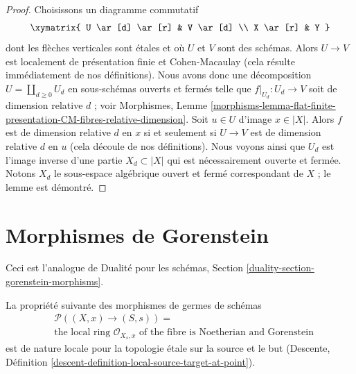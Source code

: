 \begin{proof}
Choisissons un diagramme commutatif
$$
\xymatrix{
U \ar[d] \ar[r] & V \ar[d] \\
X \ar[r] & Y
}
$$
dont les flèches verticales sont étales et où $U$ et $V$ sont des schémas.
Alors $U \to V$ est localement de présentation finie et Cohen-Macaulay
(cela résulte immédiatement de nos définitions).
Nous avons donc une décomposition $U = \coprod_{d \geq 0} U_d$
en sous-schémas ouverts et fermés telle que $f|_{U_d} : U_d \to V$
soit de dimension relative $d$ ; voir Morphismes, Lemme
\ref{morphisms-lemma-flat-finite-presentation-CM-fibres-relative-dimension}.
Soit $u \in U$ d'image $x \in |X|$. Alors
$f$ est de dimension relative $d$ en $x$ si et seulement si
$U \to V$ est de dimension relative $d$ en $u$
(cela découle de nos définitions).
Nous voyons ainsi que $U_d$ est l'image inverse
d'une partie $X_d \subset |X|$ qui est nécessairement
ouverte et fermée. Notons $X_d$ le sous-espace algébrique
ouvert et fermé correspondant de $X$ ; le lemme est démontré.
\end{proof}







\section{Morphismes de Gorenstein}
\label{section-gorenstein}

\noindent
Ceci est l'analogue de Dualité pour les schémas, Section
\ref{duality-section-gorenstein-morphisms}.

\begin{lemma}
\label{lemma-gorenstein-local-ring-fibre}
La propriété suivante des morphismes de germes de schémas
\begin{align*}
& \mathcal{P}((X, x) \to (S, s)) = \\
& \text{the local ring }
\mathcal{O}_{X_s, x}
\text{ of the fibre is Noetherian and Gorenstein}
\end{align*}
est de nature locale pour la topologie étale sur la source et le but (Descente, Définition
\ref{descent-definition-local-source-target-at-point}).
\end{lemma}


